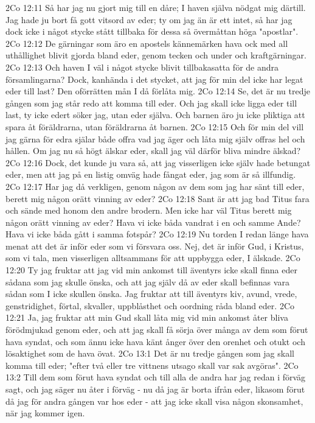 2Co 12:11  Så har jag nu gjort mig till en dåre; I haven själva nödgat mig därtill. Jag hade ju bort få gott vitsord av eder; ty om jag än är ett intet, så har jag dock icke i något stycke stått tillbaka för dessa så övermåttan höga "apostlar".
2Co 12:12  De gärningar som äro en apostels kännemärken hava ock med all uthållighet blivit gjorda bland eder, genom tecken och under och kraftgärningar.
2Co 12:13  Och haven I väl i något stycke blivit tillbakasatta för de andra församlingarna? Dock, kanhända i det stycket, att jag för min del icke har legat eder till last? Den oförrätten mån I då förlåta mig.
2Co 12:14  Se, det är nu tredje gången som jag står redo att komma till eder. Och jag skall icke ligga eder till last, ty icke edert söker jag, utan eder själva. Och barnen äro ju icke pliktiga att spara åt föräldrarna, utan föräldrarna åt barnen.
2Co 12:15  Och för min del vill jag gärna för edra själar både offra vad jag äger och låta mig själv offras hel och hållen. Om jag nu så högt älskar eder, skall jag väl därför bliva mindre älskad?
2Co 12:16  Dock, det kunde ju vara så, att jag visserligen icke själv hade betungat eder, men att jag på en listig omväg hade fångat eder, jag som är så illfundig.
2Co 12:17  Har jag då verkligen, genom någon av dem som jag har sänt till eder, berett mig någon orätt vinning av eder?
2Co 12:18  Sant är att jag bad Titus fara och sände med honom den andre brodern. Men icke har väl Titus berett mig någon orätt vinning av eder? Hava vi icke båda vandrat i en och samme Ande? Hava vi icke båda gått i samma fotspår?
2Co 12:19  Nu torden I redan länge hava menat att det är inför eder som vi försvara oss. Nej, det är inför Gud, i Kristus, som vi tala, men visserligen alltsammans för att uppbygga eder, I älskade.
2Co 12:20  Ty jag fruktar att jag vid min ankomst till äventyrs icke skall finna eder sådana som jag skulle önska, och att jag själv då av eder skall befinnas vara sådan som I icke skullen önska. Jag fruktar att till äventyrs kiv, avund, vrede, genstridighet, förtal, skvaller, uppblåsthet och oordning råda bland eder.
2Co 12:21  Ja, jag fruktar att min Gud skall låta mig vid min ankomst åter bliva förödmjukad genom eder, och att jag skall få sörja över många av dem som förut hava syndat, och som ännu icke hava känt ånger över den orenhet och otukt och lösaktighet som de hava övat.
2Co 13:1  Det är nu tredje gången som jag skall komma till eder; "efter två eller tre vittnens utsago skall var sak avgöras".
2Co 13:2  Till dem som förut hava syndat och till alla de andra har jag redan i förväg sagt, och jag säger nu åter i förväg - nu då jag är borta ifrån eder, likasom förut då jag för andra gången var hos eder - att jag icke skall visa någon skonsamhet, när jag kommer igen.
